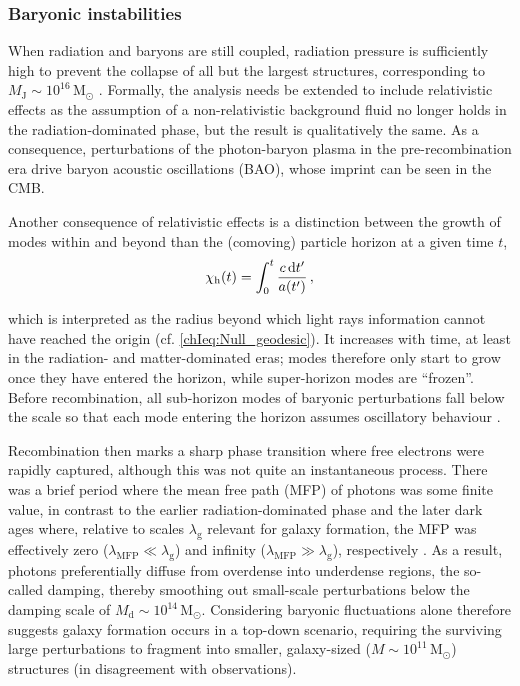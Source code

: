 \subsubsection{Baryonic instabilities}
\label{chIsssec:Baryonic_instabilities}

When radiation and baryons are still coupled, radiation pressure is sufficiently high to prevent the collapse of all but the largest structures, corresponding to $M_\text{J} \sim 10^{16} \, \mathrm{M_\odot}$ \citep[the mass of the largest galaxy clusters;][]{2010gfe..book.....M}. Formally, the \citeauthor{1902RSPTA.199....1J} analysis needs be extended to include relativistic effects \citep[e.g.][]{1946ZhETF..16..587L} as the assumption of a non-relativistic background fluid no longer holds in the radiation-dominated phase, but the result is qualitatively the same. As a consequence, perturbations of the photon-baryon plasma in the pre-recombination era drive baryon acoustic oscillations (BAO), whose imprint can be seen in the CMB.

Another consequence of relativistic effects is a distinction between the growth of modes within and beyond than the (comoving) particle horizon at a given time $t$,
\begin{equation}
    \label{chIeq:Particle_horizon}
    \chi_\text{h}(t) = \int_{0}^{t} \frac{c \dif t'}{a(t')} \, ,
\end{equation}

\noindent which is interpreted as the radius beyond which light rays information cannot have reached the origin (cf. \cref{chIeq:Null_geodesic}). It increases with time, at least in the radiation- and matter-dominated eras; modes therefore only start to grow once they have entered the horizon, while super-horizon modes are ``frozen''. Before recombination, all sub-horizon modes of baryonic perturbations fall below the \citeauthor{1902RSPTA.199....1J} scale so that each mode entering the horizon assumes oscillatory behaviour \citep[e.g.][]{1981ApJ...248..885P}.

Recombination then marks a sharp phase transition where free electrons were rapidly captured, although this was not quite an instantaneous process. There was a brief period where the mean free path (MFP) of photons was some finite value, in contrast to the earlier radiation-dominated phase and the later dark ages where, relative to scales $\lambda_\text{g}$ relevant for galaxy formation, the MFP was effectively zero ($\lambda_\text{MFP} \ll \lambda_\text{g}$) and infinity ($\lambda_\text{MFP} \gg \lambda_\text{g}$), respectively \citep{1968ApJ...151..459S}. As a result, photons preferentially diffuse from overdense into underdense regions, the so-called \citeauthor{1968ApJ...151..459S} damping, thereby smoothing out small-scale perturbations below the damping scale of $M_\text{d} \sim 10^{14} \, \mathrm{M_\odot}$. Considering baryonic fluctuations alone therefore suggests galaxy formation occurs in a top-down scenario, requiring the surviving large perturbations to fragment into smaller, galaxy-sized ($M \sim 10^{11} \, \mathrm{M_\odot}$) structures (in disagreement with observations).

